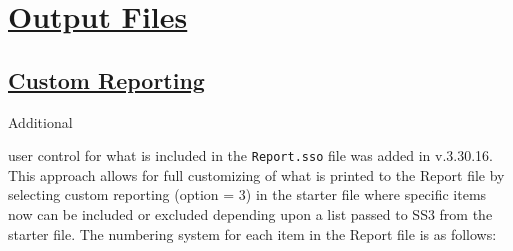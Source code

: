 \hypertarget{OutputFiles}{}
\section[Output Files]{\protect\hyperlink{OutputFiles}{Output Files}}

\hypertarget{CustomReporting}{}
\subsection[Custom Reporting]{\protect\hyperlink{CustomReporting}{Custom Reporting}}
\hypertarget{custom}{Additional} user control for what is included in the \texttt{Report.sso} file was added in v.3.30.16. This approach allows for full customizing of what is printed to the Report file by selecting custom reporting (option = 3) in the starter file where specific items now can be included or excluded depending upon a list passed to SS3 from the starter file. The numbering system for each item in the Report file is as follows:

